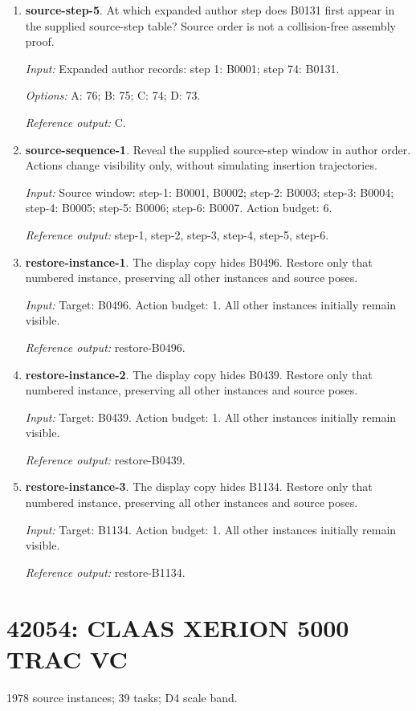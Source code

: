 \begin{enumerate}
\item \textbf{source-step-5}. At which expanded author step does B0131 first appear in the supplied source-step table? Source order is not a collision-free assembly proof.\par {\small \textit{Input:} Expanded author records: step 1: B0001; step 74: B0131. \par\textit{Options:} A: 76; B: 75; C: 74; D: 73. \par\textit{Reference output:} C.}
\item \textbf{source-sequence-1}. Reveal the supplied source-step window in author order. Actions change visibility only, without simulating insertion trajectories.\par {\small \textit{Input:} Source window: step-1: B0001, B0002; step-2: B0003; step-3: B0004; step-4: B0005; step-5: B0006; step-6: B0007. Action budget: 6. \par\textit{Reference output:} step-1, step-2, step-3, step-4, step-5, step-6.}
\item \textbf{restore-instance-1}. The display copy hides B0496. Restore only that numbered instance, preserving all other instances and source poses.\par {\small \textit{Input:} Target: B0496. Action budget: 1. All other instances initially remain visible. \par\textit{Reference output:} restore-B0496.}
\item \textbf{restore-instance-2}. The display copy hides B0439. Restore only that numbered instance, preserving all other instances and source poses.\par {\small \textit{Input:} Target: B0439. Action budget: 1. All other instances initially remain visible. \par\textit{Reference output:} restore-B0439.}
\item \textbf{restore-instance-3}. The display copy hides B1134. Restore only that numbered instance, preserving all other instances and source poses.\par {\small \textit{Input:} Target: B1134. Action budget: 1. All other instances initially remain visible. \par\textit{Reference output:} restore-B1134.}
\end{enumerate}
\clearpage
\section{42054: CLAAS XERION 5000 TRAC VC}
1978 source instances; 39 tasks; D4 scale band.

